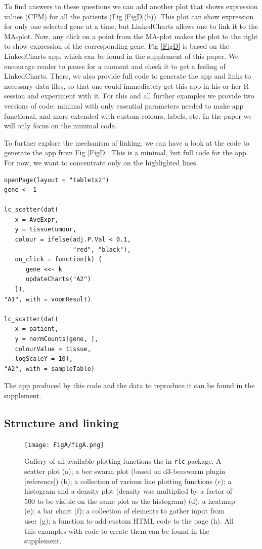 \documentclass[twocolumn,10pt]{article}
\begin{document}
To find answers to these questions we can add another plot that shows expression values (CPM) for all the patients (Fig \ref{FigD}(b)). This plot can show expression for only one selected gene at a time, but LinkedCharts allows one to link it to the MA-plot. Now, any click on a point from the MA-plot makes the plot to the right to show expression of the corresponding gene. Fig \ref{FigD} is based on the LinkedCharts app, which can be found in the supplement of this paper. We encourage reader to pause for a moment and check it to get a feeling of LinkedCharts. There, we also provide full code to generate the app and links to necessary data files, so that one could immediately get this app in his or her R session and experiment with it. For this and all further examples we provide two versions of code: minimal with only essential parameters needed to make app functional, and more extended with custom colours, labels, etc. In the paper we will only focus on the minimal code.

To further explore the mechanism of linking, we can have a look at the code to generate the app from Fig \ref{FigD}. This is a minimal, but full code for the app. For now, we want to concentrate only on the highlighted lines.

\begin{verbatim}
openPage(layout = "table1x2")
gene <- 1

lc_scatter(dat(
   x = AveExpr,
   y = tissuetumour,
   colour = ifelse(adj.P.Val < 0.1, 
                   "red", "black"),
   on_click = function(k) { 
      gene <<- k
      updateCharts("A2") 
   }),
"A1", with = voomResult)

lc_scatter(dat(
   x = patient,
   y = normCounts[gene, ],
   colourValue = tissue, 
   logScaleY = 10),
"A2", with = sampleTable)
\end{verbatim}

The app produced by this code and the data to reproduce it can be found in the supplement.


\subsection{Structure and linking}
\begin{figure}
	\texttt{[image: FigA/figA.png]}
	\caption{Gallery of all available plotting functions the in \texttt{rlc} package. A scatter plot (a); a bee swarm plot (based on d3-beeswarm plugin [reference]) (b); a collection of various line plotting functions (c); a histogram and a density plot (density was multiplied by a factor of 500 to be visible on the same plot as the histogram) (d); a heatmap (e); a bar chart (f); a collection of elements to gather input from user (g); a function to add custom HTML code to the page (h). All this examples with code to create them can be found in the supplement.}
	\label{FigA}
\end{figure}
\end{document}
